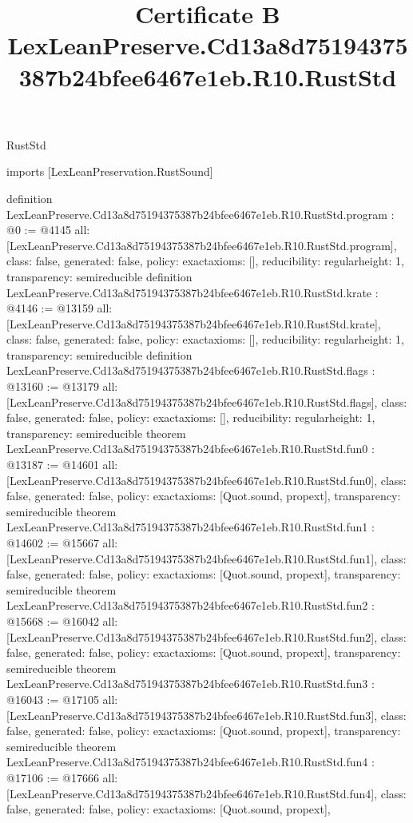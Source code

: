 \begin{lexlean}{RustStd}
\title{Certificate B LexLeanPreserve.Cd13a8d75194375387b24bfee6467e1eb.R10.RustStd}
\begin{coremodule}
imports [LexLeanPreservation.RustSound]

definition LexLeanPreserve.Cd13a8d75194375387b24bfee6467e1eb.R10.RustStd.program : @0 := @4145 {
  all: [LexLeanPreserve.Cd13a8d75194375387b24bfee6467e1eb.R10.RustStd.program],
  class: false,
  generated: false,
  policy: exact{axioms: []},
  reducibility: regular{height: 1},
  transparency: semireducible
}
definition LexLeanPreserve.Cd13a8d75194375387b24bfee6467e1eb.R10.RustStd.krate : @4146 := @13159 {
  all: [LexLeanPreserve.Cd13a8d75194375387b24bfee6467e1eb.R10.RustStd.krate],
  class: false,
  generated: false,
  policy: exact{axioms: []},
  reducibility: regular{height: 1},
  transparency: semireducible
}
definition LexLeanPreserve.Cd13a8d75194375387b24bfee6467e1eb.R10.RustStd.flags : @13160 := @13179 {
  all: [LexLeanPreserve.Cd13a8d75194375387b24bfee6467e1eb.R10.RustStd.flags],
  class: false,
  generated: false,
  policy: exact{axioms: []},
  reducibility: regular{height: 1},
  transparency: semireducible
}
theorem LexLeanPreserve.Cd13a8d75194375387b24bfee6467e1eb.R10.RustStd.fun0 : @13187 := @14601 {
  all: [LexLeanPreserve.Cd13a8d75194375387b24bfee6467e1eb.R10.RustStd.fun0],
  class: false,
  generated: false,
  policy: exact{axioms: [Quot.sound, propext]},
  transparency: semireducible
}
theorem LexLeanPreserve.Cd13a8d75194375387b24bfee6467e1eb.R10.RustStd.fun1 : @14602 := @15667 {
  all: [LexLeanPreserve.Cd13a8d75194375387b24bfee6467e1eb.R10.RustStd.fun1],
  class: false,
  generated: false,
  policy: exact{axioms: [Quot.sound, propext]},
  transparency: semireducible
}
theorem LexLeanPreserve.Cd13a8d75194375387b24bfee6467e1eb.R10.RustStd.fun2 : @15668 := @16042 {
  all: [LexLeanPreserve.Cd13a8d75194375387b24bfee6467e1eb.R10.RustStd.fun2],
  class: false,
  generated: false,
  policy: exact{axioms: [Quot.sound, propext]},
  transparency: semireducible
}
theorem LexLeanPreserve.Cd13a8d75194375387b24bfee6467e1eb.R10.RustStd.fun3 : @16043 := @17105 {
  all: [LexLeanPreserve.Cd13a8d75194375387b24bfee6467e1eb.R10.RustStd.fun3],
  class: false,
  generated: false,
  policy: exact{axioms: [Quot.sound, propext]},
  transparency: semireducible
}
theorem LexLeanPreserve.Cd13a8d75194375387b24bfee6467e1eb.R10.RustStd.fun4 : @17106 := @17666 {
  all: [LexLeanPreserve.Cd13a8d75194375387b24bfee6467e1eb.R10.RustStd.fun4],
  class: false,
  generated: false,
  policy: exact{axioms: [Quot.sound, propext]},
}
\end{coremodule}
\end{lexlean}
